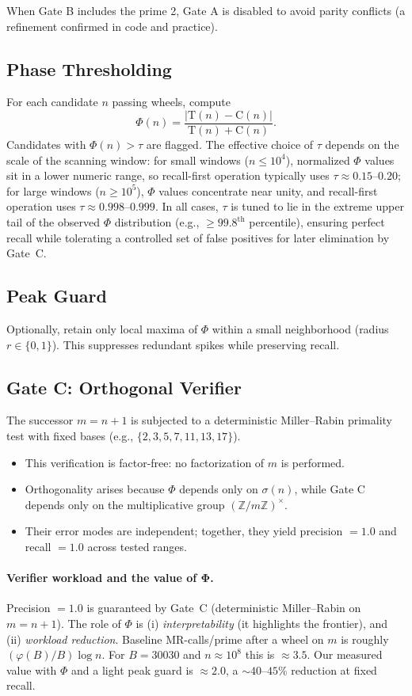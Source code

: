 \documentclass[11pt]{article}
\theoremstyle{plain}
\theoremstyle{definition}
\newcommand{\tension}{\mathrm{T}}                           %
\newcommand{\curv}{\mathrm{C}}                              %
\newcommand{\phidet}{\Phi}                                  %
\begin{document}
When Gate B includes the prime 2, Gate A is disabled to avoid parity conflicts (a refinement confirmed in code and practice).

\subsection{Phase Thresholding}
For each candidate $n$ passing wheels, compute
\[
\phidet(n) = \frac{|\tension(n) - \curv(n)|}{\tension(n) + \curv(n)}.
\]
Candidates with $\Phi(n) > \tau$ are flagged. The effective choice of $\tau$ depends on the 
scale of the scanning window: for small windows ($n \leq 10^{4}$), normalized $\Phi$ values 
sit in a lower numeric range, so recall-first operation typically uses $\tau \approx 0.15$--$0.20$; 
for large windows ($n \geq 10^{5}$), $\Phi$ values concentrate near unity, and recall-first 
operation uses $\tau \approx 0.998$--$0.999$. In all cases, $\tau$ is tuned to lie in the 
extreme upper tail of the observed $\Phi$ distribution (e.g., $\geq 99.8^{\mathrm{th}}$ percentile), 
ensuring perfect recall while tolerating a controlled set of false positives for later elimination 
by Gate~C.

\subsection{Peak Guard}
Optionally, retain only local maxima of $\phidet$ within a small neighborhood (radius $r \in \{0,1\}$). This suppresses redundant spikes while preserving recall.

\subsection{Gate C: Orthogonal Verifier}
The successor $m=n+1$ is subjected to a deterministic Miller–Rabin primality test with fixed bases (e.g., $\{2,3,5,7,11,13,17\}$).  
\begin{itemize}
  \item This verification is factor-free: no factorization of $m$ is performed.  
  \item Orthogonality arises because $\Phi$ depends only on $\sigma(n)$, while Gate C depends only on the multiplicative group $(\mathbb{Z}/m\mathbb{Z})^\times$.  
  \item Their error modes are independent; together, they yield precision $=1.0$ and recall $=1.0$ across tested ranges.  
\end{itemize}

\paragraph{Verifier workload and the value of $\boldsymbol{\Phi}$.}
Precision $=1.0$ is guaranteed by Gate~C (deterministic Miller–Rabin on $m=n+1$). The role of $\Phi$ is (i) \emph{interpretability} (it highlights the frontier), and (ii) \emph{workload reduction}. Baseline MR-calls/prime after a wheel on $m$ is roughly $(\varphi(B)/B)\log n$. For $B=30030$ and $n\approx 10^8$ this is $\approx 3.5$. Our measured value with $\Phi$ and a light peak guard is $\approx 2.0$, a $\sim 40$–$45\%$ reduction at fixed recall.
\end{document}
